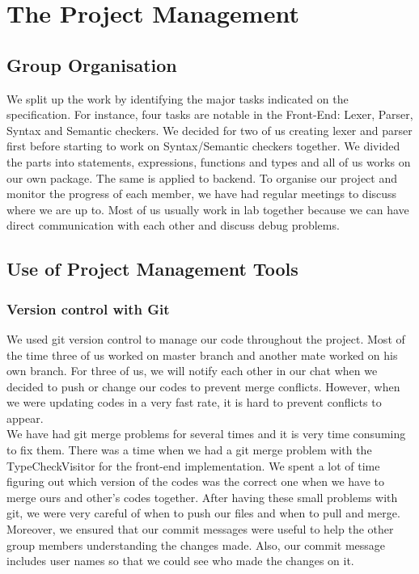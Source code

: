 \documentclass[a4paper]{article}
\theoremstyle{definition}
\begin{document}

\section{The Project Management}
\subsection{Group Organisation}
We split up the work by identifying the major tasks indicated on the specification. For instance, four tasks are notable in the Front-End: Lexer, Parser, Syntax and Semantic checkers. We decided for two of us creating lexer and parser first before starting to work on Syntax/Semantic checkers together. We divided the parts into statements, expressions, functions and types and all of us works on our own package. The same is applied to backend. To organise our project and monitor the progress of each member, we have had regular meetings to discuss where we are up to. Most of us usually work in lab together because we can have direct communication with each other and discuss debug problems.

\subsection{Use of Project Management Tools}
\subsubsection{Version control with Git}
We used git version control to manage our code throughout the project. Most of the time three of us worked on master branch and another mate worked on his own branch. For three of us, we will notify each other in our chat when we decided to push or change our codes to prevent merge conflicts. However, when we were updating codes in a very fast rate, it is hard to prevent conflicts to appear.
\\
\phantom{3ex} We have had git merge problems for several times and it is very time consuming to fix them. There was a time when we had a git merge problem with the TypeCheckVisitor for the front-end implementation. We spent a lot of time figuring out which version of the codes was the correct one when we have to merge ours and other's codes together. After having these small problems with git, we were very careful of when to push our files and when to pull and merge. Moreover, we ensured that our commit messages were useful to help the other group members understanding the changes made. Also, our commit message includes user names so that we could see who made the changes on it.
\end{document}

